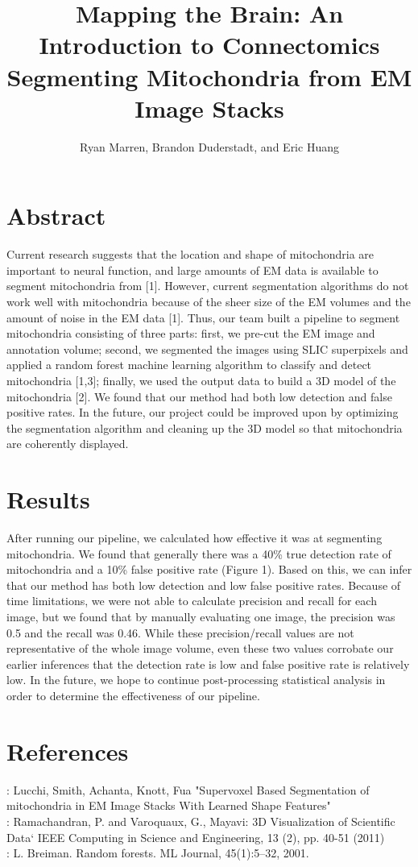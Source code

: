 \documentclass[11pt]{article} %
\title{Mapping the Brain: An Introduction to Connectomics\\Segmenting Mitochondria from EM Image Stacks}
\author{Ryan Marren, Brandon Duderstadt, and Eric Huang}
\begin{document}
\maketitle

\section{Abstract}

Current research suggests that the location and shape of mitochondria are important to neural function, and large amounts of EM data is available to segment mitochondria from [1]. However, current segmentation algorithms do not work well with mitochondria because of the sheer size of the EM volumes and the amount of noise in the EM data [1]. 
Thus, our team built a pipeline to segment mitochondria consisting of three parts: first, we pre-cut the EM image and annotation volume; second, we segmented the images using SLIC superpixels and applied a random forest machine learning algorithm to classify and detect mitochondria [1,3]; finally, we used the output data to build a 3D model of the mitochondria [2].
We found that our method had both low detection and false positive rates. In the future, our project could be improved upon by optimizing the segmentation algorithm and cleaning up the 3D model so that mitochondria are coherently displayed.

\section{Results}

After running our pipeline, we calculated how effective it was at segmenting mitochondria. We found that generally there was a 40\% true detection rate of mitochondria and a 10\% false positive rate (Figure 1). Based on this, we can infer that our method has both low detection and low false positive rates. Because of time limitations, we were not able to calculate precision and recall for each image, but we found that by manually evaluating one image, the precision was 0.5 and the recall was 0.46. While these precision/recall values are not representative of the whole image volume, even these two values corrobate our earlier inferences that the detection rate is low and false positive rate is relatively low. In the future, we hope to continue post-processing statistical analysis in order to determine the effectiveness of our pipeline.

\section{References}
\rbrack: Lucchi, Smith, Achanta, Knott, Fua "Supervoxel Based Segmentation of mitochondria in EM Image Stacks With Learned Shape Features"\\
\rbrack: Ramachandran, P. and Varoquaux, G., Mayavi: 3D Visualization of Scientific Data` IEEE Computing in Science and Engineering, 13 (2), pp. 40-51 (2011)\\
\rbrack: L. Breiman. Random forests. ML Journal, 45(1):5–32, 2001. \\
\end{document}
